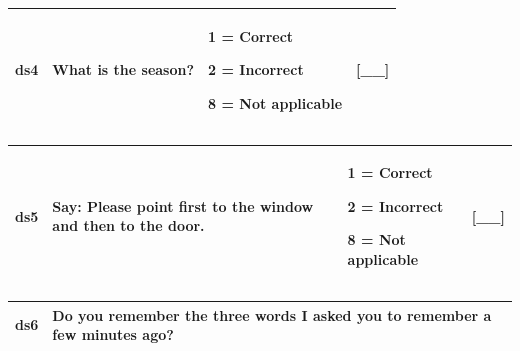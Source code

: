 \documentclass[12pt,a4paper]{book}
\theoremstyle{definition}
\theoremstyle{definition}
\theoremstyle{definition}
\theoremstyle{remark}
\begin{document}
\begin{longtable}[]{@{}llll@{}}
\toprule
\begin{minipage}[t]{0.24\columnwidth}\raggedright
ds4\strut
\end{minipage} & \begin{minipage}[t]{0.24\columnwidth}\raggedright
What is the season?\strut
\end{minipage} & \begin{minipage}[t]{0.24\columnwidth}\raggedright
1 = Correct

2 = Incorrect

8 = Not applicable\strut
\end{minipage} & \begin{minipage}[t]{0.24\columnwidth}\raggedright
{[}\_\_{]}\strut
\end{minipage}\tabularnewline
\bottomrule
\end{longtable}

\begin{longtable}[]{@{}llll@{}}
\toprule
\begin{minipage}[t]{0.24\columnwidth}\raggedright
ds5\strut
\end{minipage} & \begin{minipage}[t]{0.24\columnwidth}\raggedright
Say: Please point first to the window and then to the door.\strut
\end{minipage} & \begin{minipage}[t]{0.24\columnwidth}\raggedright
1 = Correct

2 = Incorrect

8 = Not applicable\strut
\end{minipage} & \begin{minipage}[t]{0.24\columnwidth}\raggedright
{[}\_\_{]}\strut
\end{minipage}\tabularnewline
\bottomrule
\end{longtable}

\begin{longtable}[]{@{}ll@{}}
\toprule
\begin{minipage}[t]{0.09\columnwidth}\raggedright
ds6\strut
\end{minipage} & \begin{minipage}[t]{0.85\columnwidth}\raggedright
Do you remember the three words I asked you to remember a few minutes
ago?\strut
\end{minipage}\tabularnewline
\bottomrule
\end{longtable}
\end{document}
